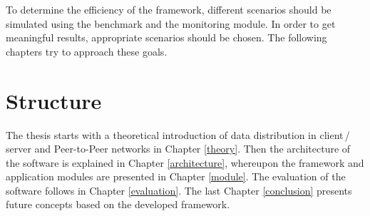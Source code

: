 To determine the efficiency of the framework, different scenarios should be simulated using the benchmark and the monitoring module. In order to get meaningful results, appropriate scenarios should be chosen. The following chapters try to approach these goals.

\section{Structure}
The thesis starts with a theoretical introduction of data distribution in client\,/\,server and Peer-to-Peer networks in Chapter \ref{theory}. Then the architecture of the software is explained in Chapter \ref{architecture}, whereupon the framework and application modules are presented in Chapter \ref{module}. The evaluation of the software follows in Chapter \ref{evaluation}. The last Chapter \ref{conclusion} presents future concepts based on the developed framework.